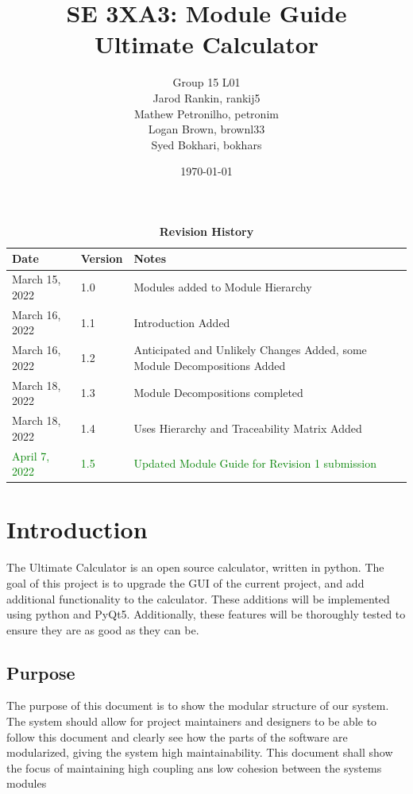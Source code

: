 \documentclass[12pt, titlepage]{article}
\title{SE 3XA3: Module Guide\\Ultimate Calculator}
\author{Group 15 L01
		\\ Jarod Rankin, rankij5
		\\ Mathew Petronilho, petronim
		\\ Logan Brown, brownl33
		\\ Syed Bokhari, bokhars
}
\date{\today}
\begin{document}
\maketitle

\tableofcontents
\listoftables
\listoffigures

\begin{table}[H]
\caption{\bf Revision History}
\begin{tabularx}{\textwidth}{p{3cm}p{2cm}X}
\toprule {\bf Date} & {\bf Version} & {\bf Notes}\\
\midrule
March 15, 2022 & 1.0 & Modules added to Module Hierarchy\\
March 16, 2022 & 1.1 & Introduction Added\\
March 16, 2022 & 1.2 & Anticipated and Unlikely Changes Added, some Module Decompositions Added\\
March 18, 2022 & 1.3 & Module Decompositions completed\\
March 18, 2022 & 1.4 & Uses Hierarchy and Traceability Matrix Added\\
\textcolor{Green}{April 7, 2022} & \textcolor{Green}{1.5} & \textcolor{Green}{Updated Module Guide for Revision 1 submission}\\
\bottomrule
\end{tabularx}
\end{table}

\newpage


\section{Introduction}
The Ultimate Calculator is an open source calculator, written in python. The goal of this project is to upgrade the GUI of the current project, and add additional functionality to the calculator. These additions will be implemented using python and PyQt5. Additionally, these features will be thoroughly tested to ensure they are as good as they can be.
\subsection{Purpose}
The purpose of this document is to show the modular structure of our system. The system should allow for project maintainers and designers to be able to follow this document and clearly see how the parts of the software are modularized, giving the system high maintainability. This document shall show the focus of maintaining high coupling ans low cohesion between the systems modules
\end{document}
